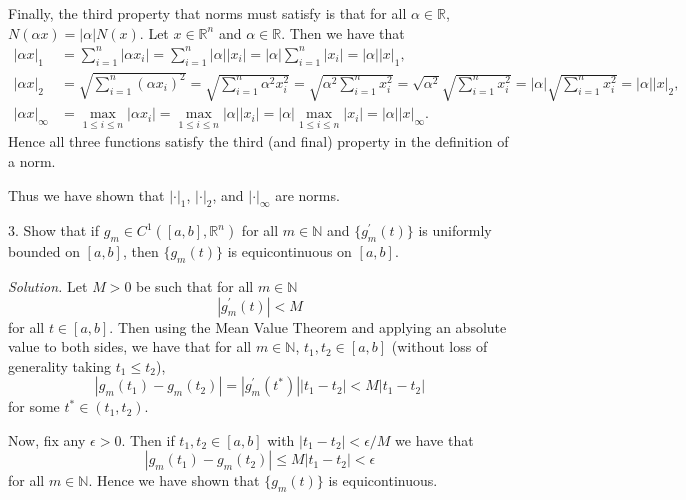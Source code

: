 \documentclass{article}
\newcommand{\N}{\mathbb{N}}
\newcommand{\R}{\mathbb{R}}
\begin{document}
Finally, the third property that norms must satisfy is that for all $\alpha \in \R$,
$N(\alpha x) = |\alpha| N(x)$. Let $x \in \R^n$ and $\alpha \in \R$. Then we have that
%
\begin{align*}
    |\alpha x|_1
        &= \sum_{i = 1}^n |\alpha x_i|
        = \sum_{i = 1}^n |\alpha| |x_i|
        = |\alpha| \sum_{i = 1}^n |x_i|
        = |\alpha| |x|_1
        , \\
    |\alpha x|_2
        &= \sqrt{\sum_{i = 1}^n (\alpha x_i)^2}
        = \sqrt{\sum_{i = 1}^n \alpha^2 x_i^2}
        = \sqrt{\alpha^2 \sum_{i = 1}^n x_i^2}
        = \sqrt{\alpha^2} \sqrt{\sum_{i = 1}^n x_i^2}
        = |\alpha| \sqrt{\sum_{i = 1}^n x_i^2}
        = |\alpha| |x|_2
        , \\
    |\alpha x|_\infty
        &= \max_{1 \leq i \leq n} |\alpha x_i|
        = \max_{1 \leq i \leq n} |\alpha| |x_i|
        = |\alpha| \max_{1 \leq i \leq n} |x_i|
        = |\alpha| |x|_\infty
        .
\end{align*}
%
Hence all three functions satisfy the third (and final) property in the definition of a norm.

Thus we have shown that $|\cdot|_1$, $|\cdot|_2$, and $|\cdot|_\infty$ are norms.

\newpage

3. Show that if $g_m \in C^1([a, b], \R^n)$ for all $m \in \N$ and $\{g_m^\prime(t)\}$
is uniformly bounded on $[a, b]$, then $\{g_m(t)\}$ is equicontinuous on $[a, b]$.

\textit{Solution.}
Let $M > 0$ be such that for all $m \in \N$
%
\begin{equation*}
    |g_m^\prime(t)| < M
\end{equation*}
%
for all $t \in [a, b]$. Then using the Mean Value Theorem and applying
an absolute value to both sides, we have that
for all $m \in \N$, $t_1, t_2 \in [a, b]$
(without loss of generality taking $t_1 \leq t_2$),
%
\begin{equation*}
    |g_m(t_1) - g_m(t_2)| = |g_m^\prime(t^*)| |t_1 - t_2| < M |t_1 - t_2|
\end{equation*}
%
for some $t^* \in (t_1, t_2)$.

Now, fix any $\epsilon > 0$. Then if $t_1, t_2 \in [a, b]$ with
$|t_1 - t_2| < \epsilon / M$ we have that
%
\begin{equation*}
    |g_m(t_1) - g_m(t_2)| \leq M |t_1 - t_2| < \epsilon
\end{equation*}
%
for all $m \in \N$. Hence we have shown that $\{g_m(t)\}$ is equicontinuous.
\end{document}
